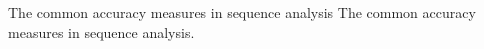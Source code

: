 \begin{table}[t!]
\begin{center}
\begin{minipage}{0.9\linewidth}\setlength{\parindent}{0pt}
\begin{center}
\end{center}
\end{minipage}
          {The common accuracy measures in sequence analysis}%
          {The common accuracy measures in sequence analysis.}%
          {}
\end{center}
\end{table}

